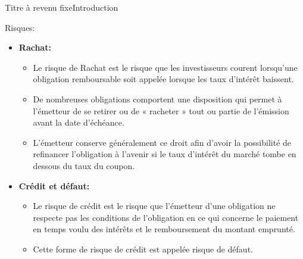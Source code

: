 \documentclass{beamer}
\begin{document}
\begin{frame}{Titre à revenu fixe}{Introduction}
\begin{block}{Risques:}
\begin{itemize}

\item \textbf{Rachat:} 
\begin{itemize}
\item Le risque de Rachat est le risque que les investisseurs courent lorsqu'une obligation remboursable soit appelée lorsque les taux d'intérêt baissent.
\item De nombreuses obligations comportent une disposition qui permet à l'émetteur de se retirer ou de « racheter » tout ou partie de l'émission avant la date d'échéance.
\item L'émetteur conserve généralement ce droit afin d'avoir la possibilité de refinancer l'obligation à l'avenir si le taux d'intérêt du marché tombe en dessous du taux du coupon.
\end{itemize}
\item \textbf{Crédit et défaut:} 
\begin{itemize}
\item Le risque de crédit est le risque que l'émetteur d'une obligation ne respecte pas les conditions de l'obligation en ce qui concerne le paiement en temps voulu des intérêts et le remboursement du montant emprunté.
\item Cette forme de risque de crédit est appelée risque de défaut.
\end{itemize}
\end{itemize}
\end{block}

\end{frame}
\end{document}
